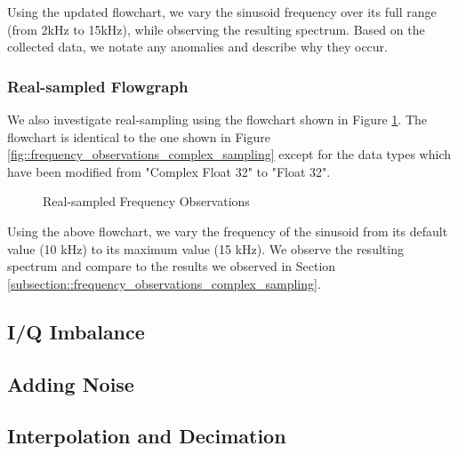 \documentclass{article}
\begin{document}
Using the updated flowchart, we vary the sinusoid frequency over its full range (from 2kHz to 15kHz), while observing the resulting spectrum. Based on the collected data, we notate any anomalies and describe why they occur. 

\subsubsection{Real-sampled Flowgraph}

We also investigate real-sampling using the flowchart shown in Figure \ref{fig::frequency_observations_real_sampling}. The flowchart is identical to the one shown in Figure \ref{fig::frequency_observations_complex_sampling} except for the data types which have been modified from "Complex Float 32" to "Float 32".

\begin{figure}[H]
	\centerline{}
	\caption{Real-sampled Frequency Observations}
	\label{fig::frequency_observations_real_sampling}
\end{figure}

Using the above flowchart, we vary the frequency of the sinusoid from its default value (10 kHz) to its maximum value (15 kHz). We observe the resulting spectrum and compare to the results we observed in Section \ref{subsection::frequency_observations_complex_sampling}.

\subsection{I/Q Imbalance}

\subsection{Adding Noise}

\subsection{Interpolation and Decimation}
\end{document}
